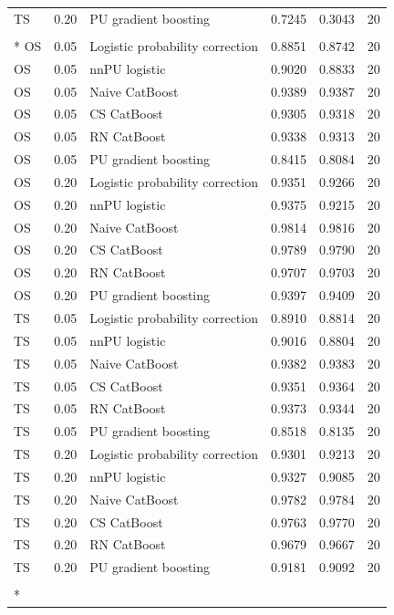 \begin{longtable}{@{}p{0.65in}rp{2.85in}rrr@{}}
TS & 0.20 & PU gradient boosting & 0.7245 & 0.3043 & 20 \\
\addlinespace[2pt]
\pagebreak
\multicolumn{6}{l}{\textbf{Optical Digits}}\\*
OS & 0.05 & Logistic probability correction & 0.8851 & 0.8742 & 20 \\
OS & 0.05 & nnPU logistic & 0.9020 & 0.8833 & 20 \\
OS & 0.05 & Naive CatBoost & 0.9389 & 0.9387 & 20 \\
OS & 0.05 & CS CatBoost & 0.9305 & 0.9318 & 20 \\
OS & 0.05 & RN CatBoost & 0.9338 & 0.9313 & 20 \\
OS & 0.05 & PU gradient boosting & 0.8415 & 0.8084 & 20 \\
\addlinespace[2pt]
OS & 0.20 & Logistic probability correction & 0.9351 & 0.9266 & 20 \\
OS & 0.20 & nnPU logistic & 0.9375 & 0.9215 & 20 \\
OS & 0.20 & Naive CatBoost & 0.9814 & 0.9816 & 20 \\
OS & 0.20 & CS CatBoost & 0.9789 & 0.9790 & 20 \\
OS & 0.20 & RN CatBoost & 0.9707 & 0.9703 & 20 \\
OS & 0.20 & PU gradient boosting & 0.9397 & 0.9409 & 20 \\
\addlinespace[2pt]
TS & 0.05 & Logistic probability correction & 0.8910 & 0.8814 & 20 \\
TS & 0.05 & nnPU logistic & 0.9016 & 0.8804 & 20 \\
TS & 0.05 & Naive CatBoost & 0.9382 & 0.9383 & 20 \\
TS & 0.05 & CS CatBoost & 0.9351 & 0.9364 & 20 \\
TS & 0.05 & RN CatBoost & 0.9373 & 0.9344 & 20 \\
TS & 0.05 & PU gradient boosting & 0.8518 & 0.8135 & 20 \\
\addlinespace[2pt]
TS & 0.20 & Logistic probability correction & 0.9301 & 0.9213 & 20 \\
TS & 0.20 & nnPU logistic & 0.9327 & 0.9085 & 20 \\
TS & 0.20 & Naive CatBoost & 0.9782 & 0.9784 & 20 \\
TS & 0.20 & CS CatBoost & 0.9763 & 0.9770 & 20 \\
TS & 0.20 & RN CatBoost & 0.9679 & 0.9667 & 20 \\
TS & 0.20 & PU gradient boosting & 0.9181 & 0.9092 & 20 \\
\addlinespace[2pt]
\multicolumn{6}{l}{\textbf{Phishing Websites}}\\*

\end{longtable}
